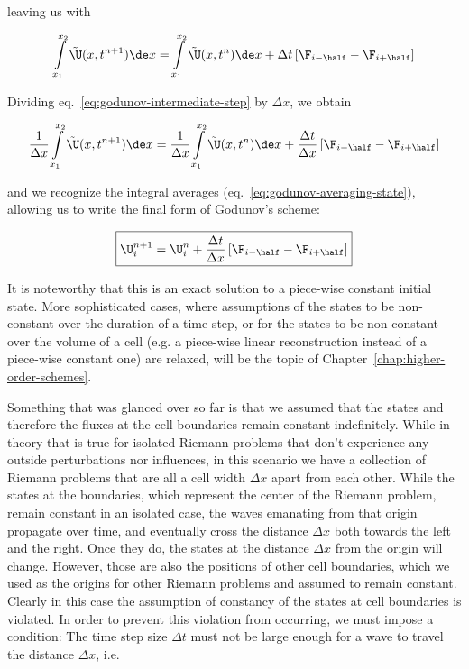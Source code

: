 leaving us with

\begin{align}
 \int\limits_{x_1}^{x_2} \tilde{\U}(x, t^{n+1}) \de x  =
 \int\limits_{x_1}^{x_2} \tilde{\U}(x, t^{n}) \de x  +
 \Delta t  \left[ \F_{i-\half} - \F_{i+\half}  \right] \label{eq:godunov-intermediate-step}
\end{align}

Dividing eq.~\ref{eq:godunov-intermediate-step} by $\Delta x$, we obtain


\begin{align}
 \frac{1}{\Delta x} \int\limits_{x_1}^{x_2} \tilde{\U}(x, t^{n+1}) \de x  =
 \frac{1}{\Delta x}  \int\limits_{x_1}^{x_2} \tilde{\U}(x, t^{n}) \de x  +
 \frac{\Delta t}{\Delta x}  \left[ \F_{i-\half} - \F_{i+\half}  \right]
\end{align}

and we recognize the integral averages (eq.~\ref{eq:godunov-averaging-state}), allowing us to write
the final form of Godunov's scheme:

\begin{align}
\boxed{
 \U^{n+1}_i = \U^{n}_i +
 \frac{\Delta t}{\Delta x}  \left[ \F_{i-\half} - \F_{i+\half}  \right]  \label{eq:godunov-scheme}
}
\end{align}




It is noteworthy that this is an exact solution to a piece-wise constant initial state. More
sophisticated cases, where assumptions of the states to be non-constant over the duration of
a time step, or for the states to be non-constant over the volume of a cell (e.g. a piece-wise
linear reconstruction instead of a piece-wise constant one) are relaxed, will be the topic of
Chapter~\ref{chap:higher-order-schemes}.

Something that was glanced over so far is that we assumed that the states and therefore the fluxes
at the cell boundaries remain constant indefinitely. While in theory that is true for isolated
Riemann problems that don't experience any outside perturbations nor influences, in this scenario
we have a collection of Riemann problems that are all a cell width $\Delta x$ apart from each
other. While the states at the boundaries, which represent the center of the Riemann problem,
remain constant in an isolated case, the waves emanating from that origin propagate over time, and
eventually cross the distance $\Delta x$ both towards the left and the right. Once they do, the
states at the distance $\Delta x$ from the origin will change. However, those are also the
positions of other cell boundaries, which we used as the origins for other Riemann problems and
assumed to remain constant. Clearly in this case the assumption of constancy of the states at cell
boundaries is violated. In order to prevent this violation from occurring, we must impose a
condition: The time step size $\Delta t$ must not be large enough for a wave to travel the distance
$\Delta x$, i.e.

